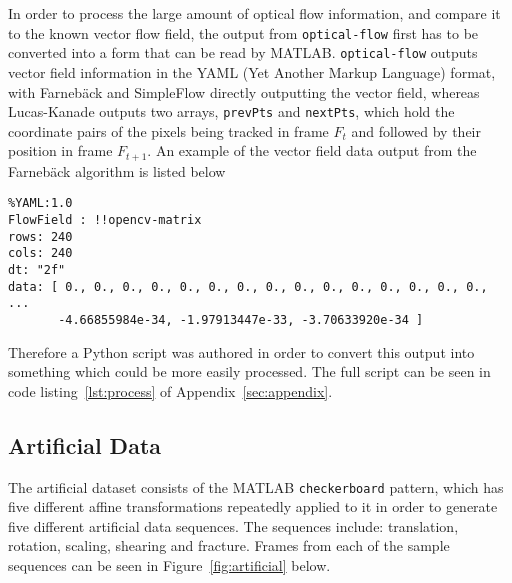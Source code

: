 In order to process the large amount of optical flow information, and compare it to the known vector flow field, the output from \verb|optical-flow| first has to be converted into a form that can be read by MATLAB. \verb|optical-flow| outputs vector field information in the YAML (Yet Another Markup Language) format, with Farnebäck and SimpleFlow directly outputting the vector field, whereas Lucas-Kanade outputs two arrays, \verb|prevPts| and \verb|nextPts|, which hold the coordinate pairs of the pixels being tracked in frame $F_t$ and followed by their position in frame $F_{t+1}$. An example of the vector field data output from the Farnebäck algorithm is listed below

\singlespacing
\begin{verbatim}
%YAML:1.0
FlowField : !!opencv-matrix
rows: 240
cols: 240
dt: "2f"
data: [ 0., 0., 0., 0., 0., 0., 0., 0., 0., 0., 0., 0., 0., 0., 0.,
...
       -4.66855984e-34, -1.97913447e-33, -3.70633920e-34 ]
\end{verbatim}
\onehalfspacing

Therefore a Python script was authored in order to convert this output into something which could be more easily processed. The full script can be seen in code listing~\ref{lst:process} of Appendix~\ref{sec:appendix}. 

\subsection{Artificial Data}

The artificial dataset consists of the MATLAB \verb|checkerboard| pattern, which has five different affine transformations repeatedly applied to it in order to generate five different artificial data sequences. The sequences include: translation, rotation, scaling, shearing and fracture. Frames from each of the sample sequences can be seen in Figure~\ref{fig:artificial} below.

